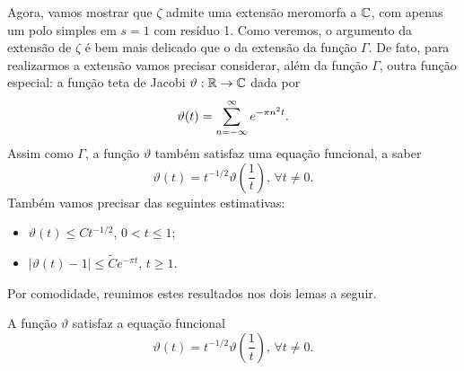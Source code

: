     Agora, vamos mostrar que $\zeta$ admite uma extensão meromorfa a $\mathbb{C}$, com apenas
    um polo simples em $s=1$ com resíduo 1. Como veremos, o argumento da extensão de
    $\zeta$ é bem mais delicado que o da extensão da função $\Gamma$. De fato,
    para realizarmos a extensão vamos precisar considerar, além da função $\Gamma$, 
    outra função especial:
    a função teta de Jacobi $\vartheta: \mathbb{R}\to\mathbb{C}$
    dada por
    \begin{equation}
    \index{Função! Teta de Jacobi}
    \label{def-funcao-teta-jacobi}
        \vartheta(t) = \sum_{n=-\infty}^{\infty} e^{-\pi n^2t}.
    \end{equation}
    Assim como $\Gamma$, a função $\vartheta$ também satisfaz uma equação funcional,
    a saber
    \begin{equation}
    \label{eq-funcional-teta}
        \vartheta(t) = t^{-1/2}\vartheta\left( \frac{1}{t} \right), \, \forall t\neq 0.
    \end{equation}
    Também vamos precisar das seguintes estimativas:
    \begin{itemize}
        \item $\vartheta(t) \leq Ct^{-1/2}$, $0 < t \leq 1$;
        \item $|\vartheta(t) - 1| \leq \widetilde{C}e^{-\pi t}$, $t\geq 1$.
    \end{itemize}
    Por comodidade, reunimos estes resultados nos dois lemas a seguir.
    \begin{lema}
    \label{lema-eq-funcional}
        A função $\vartheta$ satisfaz a equação funcional
        \[
        \vartheta(t) = t^{-1/2}\vartheta\left( \frac{1}{t} \right), \, \forall t\neq 0.
        \]
    \end{lema}

